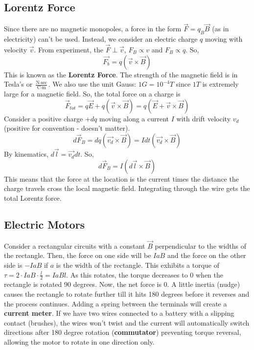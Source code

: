 \documentclass{article}
\begin{document}
\subsection{Lorentz Force}
Since there are no magnetic monopoles, a force in the form $\vec{F}=q_{B}\vec{B}$ (as in electricity) can't be used.
Instead, we consider an electric charge $q$ moving with velocity $\vec{v}$. From experiment, the $\vec{F}\perp \vec{v}$,
$F_{B}\propto v$ and $F_{B}\propto q$. So, $$\vec{F_{b}}=q(\vec{v}\times\vec{B})$$
This is known as the \textbf{Lorentz Force}. The strength of the magnetic field is in Tesla's 
or $\frac{\text{N}\cdot \text{sec}}{\text{C}\cdot \text{m}}$. We also use the unit Gauss: $1G=10^{-4}T$
since $1T$ is extremely large for a magnetic field. So, the total force on a charge is
$$\vec{F}_{tot}=q\vec{E}+q(\vec{v}\times\vec{B})=q(\vec{E}+\vec{v}\times\vec{B})$$
Consider a positive charge $+dq$ moving along a current $I$ with drift velocity $v_{d}$ (positive for convention - doesn't matter).
$$d\vec{F}_{B}=dq(\vec{v_{d}}\times \vec{B})=Idt(\vec{v_{d}}\times \vec{B})$$
By kinematics, $d\vec{l}=\vec{v_{d}}dt$. So,
$$d\vec{F}_{B}=I(d\vec{l}\times \vec{B})$$
This means that the force at the location is the current times the distance the charge travels cross the
local magnetic field. Integrating through the wire gets the total Lorentz force.

\subsection{Electric Motors}
Consider a rectangular circuits with a constant $\vec{B}$ perpendicular to the widths of the rectangle.
Then, the force on one side will be $IaB$ and the force on the other side is $-IaB$ if $a$ is the width of the 
rectangle. This exhibits a torque of $\tau=2\cdot IaB\cdot \frac{l}{2}=IaBl$. As this rotates, 
the torque decreases to $0$ when the rectangle is rotated 90 degrees. Now, the net force is $0$.
A little inertia (nudge) causes the rectangle to rotate further till it hits 180 degrees before it reverses
and the process continues. Adding a spring between the terminals will create a \textbf{current meter}.
If we have two wires connected to a battery with a slipping contact (brushes), the wires won't twist and the current 
will automatically switch directions after 180 degree rotation (\textbf{commutator}) preventing torque reversal, allowing the motor to 
rotate in one direction only.
\end{document}
